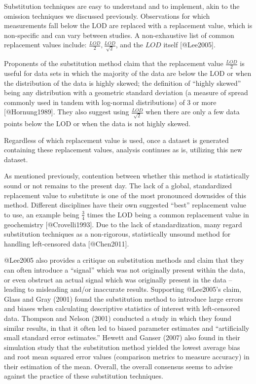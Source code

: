 \documentclass[
]{article}
\begin{document}
Substitution techniques are easy to understand and to implement, akin to
the omission techniques we discussed previously. Observations for which
measurements fall below the LOD are replaced with a replacement value,
which is non-specific and can vary between studies. A non-exhaustive
list of common replacement values include:
\(\frac{LOD}{2}, \frac{LOD}{\sqrt2}\), and the \(LOD\) itself
{[}@Lee2005{]}.

Proponents of the substitution method claim that the replacement value
\(\frac{LOD}{2}\) is useful for data sets in which the majority of the
data are below the LOD or when the distribution of the data is highly
skewed; the definition of ``highly skewed'' being any distribution with
a geometric standard deviation (a measure of spread commonly used in
tandem with log-normal distributions) of 3 or more {[}@Hornung1989{]}.
They also suggest using \(\frac{LOD}{\sqrt2}\) when there are only a few
data points below the LOD or when the data is not highly skewed.

Regardless of which replacement value is used, once a dataset is
generated containing these replacement values, analysis continues as is,
utilizing this new dataset.

As mentioned previously, contention between whether this method is
statistically sound or not remains to the present day. The lack of a
global, standardized replacement value to substitute is one of the most
pronounced downsides of this method. Different disciplines have their
own suggested ``best'' replacement value to use, an example being
\(\frac{3}{4}\) times the LOD being a common replacement value in
geochemistry {[}@Crovelli1993{]}. Due to the lack of standardization,
many regard substitution techniques as a non-rigorous, statistically
unsound method for handling left-censored data {[}@Chen2011{]}.

@Lee2005 also provides a critique on substitution methods and claim that
they can often introduce a ``signal'' which was not originally present
within the data, or even obstruct an actual signal which was originally
present in the data -- leading to misleading and/or inaccurate results.
Supporting @Lee2005's claim, Glass and Gray (2001) found the
substitution method to introduce large errors and biases when
calculating descriptive statistics of interest with left-censored data.
Thompson and Nelson (2001) conducted a study in which they found similar
results, in that it often led to biased parameter estimates and
``artificially small standard error estimates.'' Hewett and Ganser
(2007) also found in their simulation study that the substitution method
yielded the lowest average bias and root mean squared error values
(comparison metrics to measure accuracy) in their estimation of the
mean. Overall, the overall consensus seems to advise against the
practice of these substitution techniques.
\end{document}
